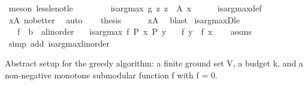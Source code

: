 \begin{isabellebody}
\ {\isacharparenleft}{\kern0pt}meson\ less{\isacharunderscore}{\kern0pt}le{\isacharunderscore}{\kern0pt}not{\isacharunderscore}{\kern0pt}le{\isacharparenright}{\kern0pt}\isanewline
\ \ \ \ \isamarkupfalse%
\isanewline
\isanewline
\ \ \isamarkupfalse%
\ {\isachardoublequoteopen}is{\isacharunderscore}{\kern0pt}arg{\isacharunderscore}{\kern0pt}max\ g\ {\isacharparenleft}{\kern0pt}{\isasymlambda}z{\isachardot}{\kern0pt}\ z\ {\isasymin}\ A{\isacharparenright}{\kern0pt}\ x{\isachardoublequoteclose}\isanewline
\ \ \ \ \isamarkupfalse%
\ is{\isacharunderscore}{\kern0pt}arg{\isacharunderscore}{\kern0pt}max{\isacharunderscore}{\kern0pt}def\isanewline
\ \ \ \ \isamarkupfalse%
\ xA\ no{\isacharunderscore}{\kern0pt}better\ \isamarkupfalse%
\ auto\isanewline
\ \ \isamarkupfalse%
\ {\isacharquery}{\kern0pt}thesis\isanewline
\ \ \ \ \isamarkupfalse%
\ xA\ \isamarkupfalse%
\ blast\isanewline
{}\isamarkupfalse%
%
\endisatagproof
{\isafoldproof}%
%
\isadelimproof
\isanewline
%
\endisadelimproof
\isanewline
{}\isamarkupfalse%
\ is{\isacharunderscore}{\kern0pt}arg{\isacharunderscore}{\kern0pt}maxD{\isacharunderscore}{\kern0pt}le{\isacharcolon}{\kern0pt}\isanewline
\ \ \ f\ {\isacharcolon}{\kern0pt}{\isacharcolon}{\kern0pt}\ {\isachardoublequoteopen}{\isacharprime}{\kern0pt}b\ {\isasymRightarrow}\ {\isacharprime}{\kern0pt}a{\isacharcolon}{\kern0pt}{\isacharcolon}{\kern0pt}linorder{\isachardoublequoteclose}\isanewline
\ \ \ {\isachardoublequoteopen}is{\isacharunderscore}{\kern0pt}arg{\isacharunderscore}{\kern0pt}max\ f\ P\ x{\isachardoublequoteclose}\ {\isachardoublequoteopen}P\ y{\isachardoublequoteclose}\isanewline
\ \ \ {\isachardoublequoteopen}f\ y\ {\isasymle}\ f\ x{\isachardoublequoteclose}\isanewline
%
\isadelimproof
\ \ %
\endisadelimproof
%
\isatagproof
{}\isamarkupfalse%
\ assms\isanewline
\ \ \isamarkupfalse%
\ {\isacharparenleft}{\kern0pt}simp\ add{\isacharcolon}{\kern0pt}\ is{\isacharunderscore}{\kern0pt}arg{\isacharunderscore}{\kern0pt}max{\isacharunderscore}{\kern0pt}linorder{\isacharparenright}{\kern0pt}%
\endisatagproof
{\isafoldproof}%
%
\isadelimproof
%
\endisadelimproof
%
\begin{isamarkuptext}%
Abstract setup for the greedy algorithm:
  a finite ground set V, a budget k, and a non-negative monotone
  submodular function f with f {} = 0.


\end{isamarkuptext}
\end{isabellebody}

